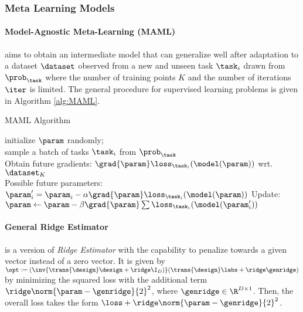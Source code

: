 \subsubsection{Meta Learning Models}

\paragraph{Model-Agnostic Meta-Learning (MAML)} aims to obtain an intermediate model that can generalize well after adaptation to a dataset $\dataset$ observed from a new and unseen task $\task_i$ drawn from $\prob_\task$ where the number of training points $K$ and the number of iterations $\iter$ is limited. The general procedure for supervised learning problems is given in Algorithm \ref{alg:MAML}.

\begin{algorithm}
  \caption{MAML\cite{Finn2017} Algorithm}\label{alg:MAML}
  \KwData{$\prob_{\task}$, $\alpha$, $\beta$}
  initialize $\param$ randomly; \\
  {
    sample a batch of tasks $\task_i$ from $\prob_{\task}$\\
    {
      Obtain future gradients: $\grad{\param}\loss_{\task_i}(\model(\param))$ wrt. $\dataset_K$ \\
      Possible future parameters: $\param_i^\prime = \param_i -\alpha\grad{\param}\loss_{\task_i}(\model(\param))$
    }
    Update: $\param \leftarrow \param- \beta\grad{\param}\sum\loss_{\task_i}(\model(\param_i^\prime))$
  }
\end{algorithm}

\paragraph{General Ridge Estimator} is a version of \textit{Ridge Estimator} with the capability to penalize towards a given vector instead of a zero vector. It is given by $\opt:=(\inv{\trans{\design}\design+\ridge \I_{D})}(\trans{\design}\labs+\ridge\genridge)$ by minimizing the squared loss with the additional term $\ridge\norm{\param-\genridge}{2}^2$, where $\genridge\in\R^{D\times 1}$. Then, the overall loss takes the form $\loss+\ridge\norm{\param-\genridge}{2}^2$.

